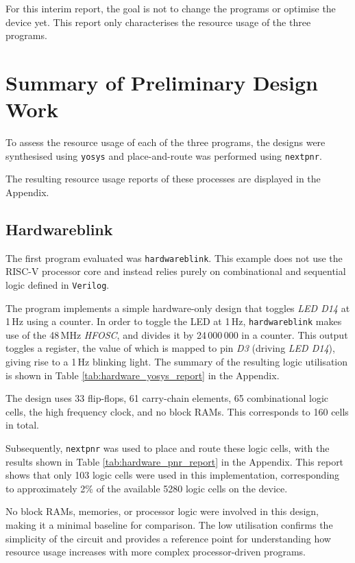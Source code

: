 \documentclass[a4paper,10pt]{article}
\begin{document}
For this interim report, the goal is not to 
change the programs or optimise the device yet.
This report only characterises the resource usage of the three programs.


\section{Summary of Preliminary Design Work}
\label{sec:Summary_of_Preliminary_Design_Work}

To assess the resource usage of each of the three programs, 
the designs were synthesised using \texttt{yosys} 
and place-and-route was performed using \texttt{nextpnr}. 

The resulting resource usage reports of these processes 
are displayed in the Appendix.

\subsection{Hardwareblink}
\label{sec:Hardwareblink}

The first program evaluated was \texttt{hardwareblink}.
This example does not use the RISC-V processor core and 
instead relies purely on combinational and 
sequential logic defined in \texttt{Verilog}.

The program implements a simple hardware-only design that 
toggles \textit{LED D14} at 1\,Hz using a counter. 
In order to toggle the LED at 1\,Hz, 
\texttt{hardwareblink} makes use of the 48\,MHz \textit{HFOSC},
and divides it by 24\,000\,000 in a counter.
This output toggles a register, 
the value of which is mapped to pin \textit{D3} (driving \textit{LED D14}),
giving rise to a 1\,Hz blinking light.
The summary of the resulting logic utilisation is shown
in Table \ref{tab:hardware_yosys_report} in the Appendix.

The design uses 33 flip-flops,
61 carry-chain elements,
65 combinational logic cells,
the high frequency clock,
and no block RAMs.
This corresponds to 160 cells in total.

Subsequently, \texttt{nextpnr} was used to place and route these logic cells,
with the results shown in Table \ref{tab:hardware_pnr_report} in the Appendix.
This report shows that only 103 logic cells were used in this implementation, 
corresponding to approximately 2\% of the available 5280 logic cells 
on the device.

No block RAMs, memories, or processor logic were involved in this design, 
making it a minimal baseline for comparison. 
The low utilisation confirms the simplicity of the circuit 
and provides a reference point for understanding 
how resource usage increases with more complex processor-driven programs.
\end{document}
